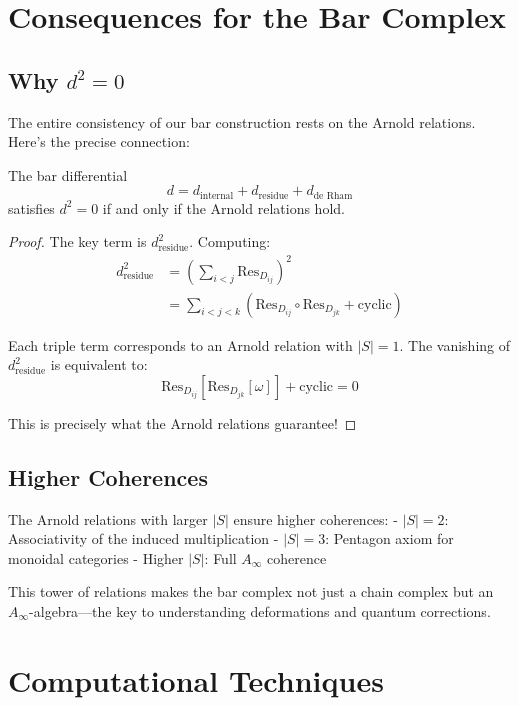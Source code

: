 \section{Consequences for the Bar Complex}

\subsection{Why $d^2 = 0$}

The entire consistency of our bar construction rests on the Arnold relations. Here's the precise connection:

\begin{theorem}
The bar differential 
$$d = d_{\text{internal}} + d_{\text{residue}} + d_{\text{de Rham}}$$
satisfies $d^2 = 0$ if and only if the Arnold relations hold.
\end{theorem}

\begin{proof}
The key term is $d_{\text{residue}}^2$. Computing:
\begin{align}
d_{\text{residue}}^2 &= \left(\sum_{i<j} \text{Res}_{D_{ij}}\right)^2 \\
&= \sum_{i<j<k} \left(\text{Res}_{D_{ij}} \circ \text{Res}_{D_{jk}} + \text{cyclic}\right)
\end{align}

Each triple term corresponds to an Arnold relation with $|S| = 1$. The vanishing of $d_{\text{residue}}^2$ is equivalent to:
$$\text{Res}_{D_{ij}}[\text{Res}_{D_{jk}}[\omega]] + \text{cyclic} = 0$$

This is precisely what the Arnold relations guarantee!
\end{proof}

\subsection{Higher Coherences}

The Arnold relations with larger $|S|$ ensure higher coherences:
- $|S| = 2$: Associativity of the induced multiplication
- $|S| = 3$: Pentagon axiom for monoidal categories
- Higher $|S|$: Full $A_\infty$ coherence

This tower of relations makes the bar complex not just a chain complex but an $A_\infty$-algebra—the key to understanding deformations and quantum corrections.

\section{Computational Techniques}

